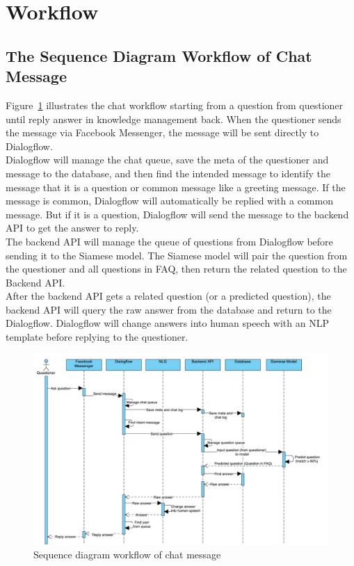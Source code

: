 \documentclass[12pt,oneside,openright,a4paper]{cpe-english-project}
\begin{document}
\pagebreak

\section{Workflow}
\subsection{The Sequence Diagram Workflow of Chat Message}
Figure~\ref*{fig:Sequence diagram workflow of chat message} illustrates the chat workflow starting from a question from questioner until reply answer in knowledge management back. When the questioner sends the message via Facebook Messenger, the message will be sent directly to Dialogflow.\\
Dialogflow will manage the chat queue, save the meta of the questioner and message to the database, and then find the intended message to identify the message that it is a question or common message like a greeting message. If the message is common, Dialogflow will automatically be replied with a common message. But if it is a question, Dialogflow will send the message to the backend API to get the answer to reply.\\
The backend API will manage the queue of questions from Dialogflow before sending it to the Siamese model. The Siamese model will pair the question from the questioner and all questions in FAQ, then return the related question to the Backend API.\\
After the backend API gets a related question (or a predicted question), the backend API will query the raw answer from the database and return to the Dialogflow. Dialogflow will change answers into human speech with an NLP template before replying to the questioner.
\begin{figure}[!h]
	\includegraphics[width=14cm]{img/ch3/sequence diagram of chat message.jpg}
	\caption{Sequence diagram workflow of chat message}\label{fig:Sequence diagram workflow of chat message}
\end{figure}
\end{document}
